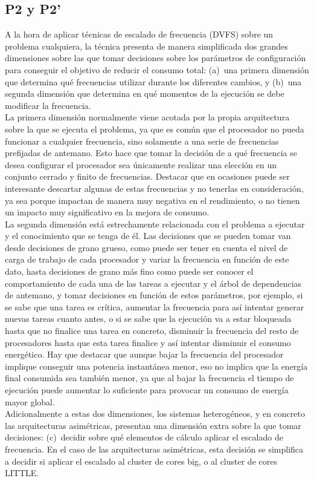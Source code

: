 \subsection{P2 y P2'}
A la hora de aplicar técnicas de escalado de frecuencia (DVFS) sobre un
problema cualquiera, la técnica presenta de manera simplificada dos grandes
dimensiones sobre las que tomar decisiones sobre los parámetros de
configuración para conseguir el objetivo de reducir el consumo total:
(a)~una primera dimensión que determina qué frecuencias utilizar durante
los diferentes cambios, y (b)~una segunda dimensión que determina en qué
momentos de la ejecución se debe modificar la frecuencia.\\
La primera dimensión normalmente viene acotada por la propia arquitectura
sobre la que se ejecuta el problema, ya que es común que el procesador no
pueda funcionar a cualquier frecuencia, sino solamente a una serie de
frecuencias prefijadas de antemano. Esto hace que tomar la decisión de a
qué frecuencia se desea configurar el procesador sea únicamente realizar
una elección en un conjunto cerrado y finito de frecuencias. Destacar que
en ocasiones puede ser interesante descartar algunas de estas frecuencias y
no tenerlas en consideración, ya sea porque impactan de manera muy negativa
en el rendimiento, o no tienen un impacto muy significativo en la mejora de
consumo.\\
La segunda dimensión está estrechamente relacionada con el problema a
ejecutar y el conocimiento que se tenga de él. Las decisiones que se pueden
tomar van desde decisiones de grano grueso, como puede ser tener en cuenta
el nivel de carga de trabajo de cada procesador y variar la frecuencia en
función de este dato, hasta decisiones de grano más fino como puede ser
conocer el comportamiento de cada una de las tareas a ejecutar y el árbol
de dependencias de antemano, y tomar decisiones en función de estos
parámetros, por ejemplo, si se sabe que una tarea es crítica, aumentar la
frecuencia para así intentar generar nuevas tareas cuanto antes, o si se
sabe que la ejecución va a estar bloqueada hasta que no finalice una tarea
en concreto, disminuir la frecuencia del resto de procesadores hasta que
esta tarea finalice y así intentar disminuir el consumo energético. Hay que
destacar que aunque bajar la frecuencia del procesador implique conseguir
una potencia instantánea menor, eso no implica que la energía final
consumida sea también menor, ya que al bajar la frecuencia el tiempo de
ejecución puede aumentar lo suficiente para provocar un consumo de energía
mayor global.\\
Adicionalmente a estas dos dimensiones, los sistemas heterogéneos, y en
concreto las arquitecturas asimétricas, presentan una dimensión extra sobre
la que tomar decisiones: (c)~decidir sobre qué elementos de cálculo aplicar
el escalado de frecuencia. En el caso de las arquitecturas asimétricas,
esta decisión se simplifica a decidir si aplicar el escalado al cluster de
cores big, o al cluster de cores LITTLE.\\

